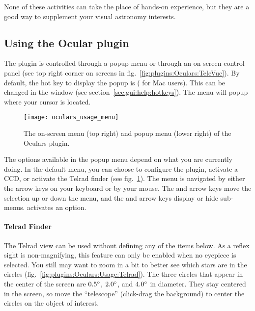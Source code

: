 \noindent None of these activities can take the place of hands-on experience, but they are a good way to supplement your visual astronomy interests.

\subsection{Using the Ocular plugin}
\label{sec:sec:plugins:Oculars:UsingPlugin}

The plugin is controlled through a popup menu or through an on-screen control panel (see top right corner on screens in fig.~\ref{fig:plugins:Oculars:TeleVue}). 
By default, the hot key to display the popup is  ( for Mac users). 
This can be changed in the  window (see section~\ref{sec:gui:help:hotkeys}). The menu will popup where your cursor is located.

\begin{figure}[t]\centering
\texttt{[image: oculars\_usage\_menu]}
\caption{The on-screen menu (top right) and popup menu (lower right) of the Oculars plugin.}
\label{fig:plugins:Oculars:Usage:Menu}
\end{figure}

The options available in the popup menu depend on what you are currently doing. 
In the default menu, you can choose to configure the plugin, activate a CCD, or activate the Telrad finder (see fig.~\ref{fig:plugins:Oculars:Usage:Menu}).
The menu is navigated by either the arrow keys on your keyboard or by your mouse. 
The \keys{\arrowkeyup} and \keys{\arrowkeydown} arrow keys move the selection up or down the menu, 
and the \keys{\arrowkeyleft} and \keys{\arrowkeyright}  arrow keys display or hide sub-menus. \keys{\return} activates an option.

\paragraph{Telrad Finder}

The Telrad view can be used without defining any of the items below. 
As a reflex sight is non-magnifying, this feature can only be enabled when no eyepiece is selected. 
You still may want to zoom in a bit to better see which stars are in the circles (fig.~\ref{fig:plugins:Oculars:Usage:Telrad}).
The three circles that appear in the center of the screen are $0.5\degree$, $2.0\degree$, and $4.0\degree$ in diameter. 
They stay centered in the screen, so move the ``telescope'' (click-drag the background) to center the circles on the object of interest. 

